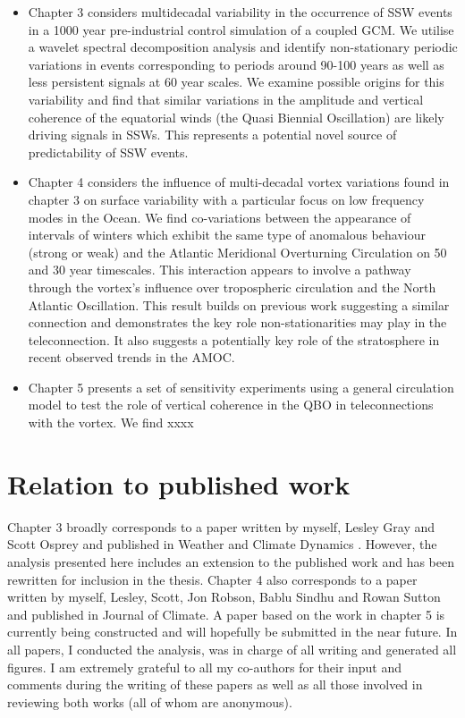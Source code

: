 \begin{itemize}
    \item Chapter 3 considers multidecadal variability in the occurrence of SSW events in a 1000 year pre-industrial control simulation of a coupled GCM. We utilise a wavelet spectral decomposition analysis and identify non-stationary periodic variations in events corresponding to periods around 90-100 years as well as less persistent signals at 60 year scales. We examine possible origins for this variability and find that similar variations in the amplitude and vertical coherence of the equatorial winds (the Quasi Biennial Oscillation) are likely driving signals in SSWs. This represents a potential novel source of predictability of SSW events.
    
    \item Chapter 4 considers the influence of multi-decadal vortex variations found in chapter 3 on surface variability with a particular focus on low frequency modes in the Ocean. We find co-variations between the appearance of intervals of winters which exhibit the same type of anomalous behaviour (strong or weak) and the Atlantic Meridional Overturning Circulation on 50 and 30 year timescales. This interaction appears to involve a pathway through the vortex's influence over tropospheric circulation and the North Atlantic Oscillation. This result builds on previous work suggesting a similar connection and demonstrates the key role non-stationarities may play in the teleconnection. It also suggests a potentially key role of the stratosphere in recent observed trends in the AMOC. 
    
    \item Chapter 5 presents a set of sensitivity experiments using a general circulation model to test the role of vertical coherence in the QBO in teleconnections with the vortex. We find xxxx 
\end{itemize}

\section{Relation to published work}

Chapter 3 broadly corresponds to a paper written by myself, Lesley Gray and Scott Osprey and published in Weather and Climate Dynamics \citep{dimdore-milesOrigins2020}. However, the analysis presented here includes an extension to the published work and has been rewritten for inclusion in the thesis. Chapter 4 also corresponds to a paper written by myself, Lesley, Scott, Jon Robson, Bablu Sindhu and Rowan Sutton and published in Journal of Climate. A paper based on the work in chapter 5 is currently being constructed and will hopefully be submitted in the near future. 
In all papers, I conducted the analysis, was in charge of all writing and generated all figures. I am extremely grateful to all my co-authors for their input and comments during the writing of these papers as well as all those involved in reviewing both works (all of whom are anonymous).  

